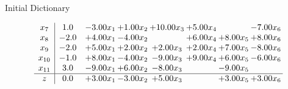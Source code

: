 \documentclass[8pt]{article}
\begin{document}
Initial Dictionary 

\[\begin{array}{c| c c@{\hskip 2pt} c@{\hskip 2pt} c@{\hskip 2pt} c@{\hskip 2pt} c@{\hskip 2pt} c@{\hskip 2pt} }
 x_{7}   &  1.0 & -3.00 x_{1} & +  1.00 x_{2} & + 10.00 x_{3} & +  5.00 x_{4} &   & -7.00 x_{6}\\
 x_{8}   &  -2.0 & +  4.00 x_{1} & -4.00 x_{2} &   & +  6.00 x_{4} & +  8.00 x_{5} & +  8.00 x_{6}\\
 x_{9}   &  -2.0 & +  5.00 x_{1} & +  2.00 x_{2} & +  2.00 x_{3} & +  2.00 x_{4} & +  7.00 x_{5} & -8.00 x_{6}\\
 x_{10}   &  -1.0 & +  8.00 x_{1} & -4.00 x_{2} & -9.00 x_{3} & +  9.00 x_{4} & +  6.00 x_{5} & -6.00 x_{6}\\
 x_{11}   &  3.0 & -9.00 x_{1} & +  6.00 x_{2} & -8.00 x_{3} &   & -9.00 x_{5} &   \\
\hline
z    &  0.0 & +  3.00 x_{1} & -3.00 x_{2} & +  5.00 x_{3} &   & +  3.00 x_{5} & +  3.00 x_{6}\\
\end{array}\]
\end{document}
